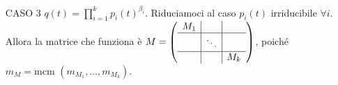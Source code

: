 \documentclass[a4paper,NoNotes,GeneralMath]{stdmdoc}
\begin{document}
\begin{itemize}
	\item[CASO 3] $q(t) = \prod_{i=1}^k p_i(t)^{\beta_i}$. Riduciamoci al caso $p_i(t)$ irriducibile $\forall i$. Allora la matrice che funziona è $M = \left( \begin{array}{c|c|c} M_1 & & \\ \hline & \ddots & \\ \hline & & M_k \end{array} \right)$, poiché $m_M = \text{mcm }(m_{M_1}, \ldots, m_{M_k})$.
	\end{itemize}
\end{document}
